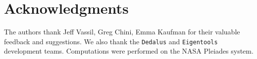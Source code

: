 \documentclass[reprint,amsmath,amssymb,aps]{revtex4-1}
\begin{document}
\section*{Acknowledgments}
The authors thank Jeff Vassil, Greg Chini, Emma Kaufman for their valuable feedback and suggestions. 
We also thank the \texttt{Dedalus} and \texttt{Eigentools} development teams. 
Computations were performed on the NASA Pleiades system.


% 

\end{document}

